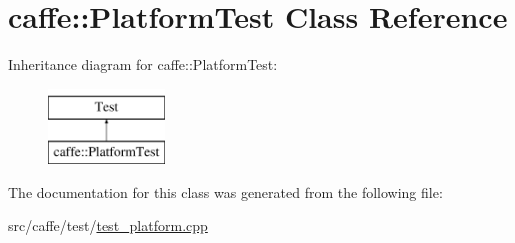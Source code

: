 \hypertarget{classcaffe_1_1_platform_test}{\section{caffe\+:\+:Platform\+Test Class Reference}
\label{classcaffe_1_1_platform_test}
}
Inheritance diagram for caffe\+:\+:Platform\+Test\+:\begin{figure}[H]
\begin{center}
\leavevmode
\includegraphics[height=2.000000cm]{classcaffe_1_1_platform_test}
\end{center}
\end{figure}


The documentation for this class was generated from the following file\+:\begin{DoxyCompactItemize}
\item 
src/caffe/test/\hyperlink{test__platform_8cpp}{test\+\_\+platform.\+cpp}\end{DoxyCompactItemize}
